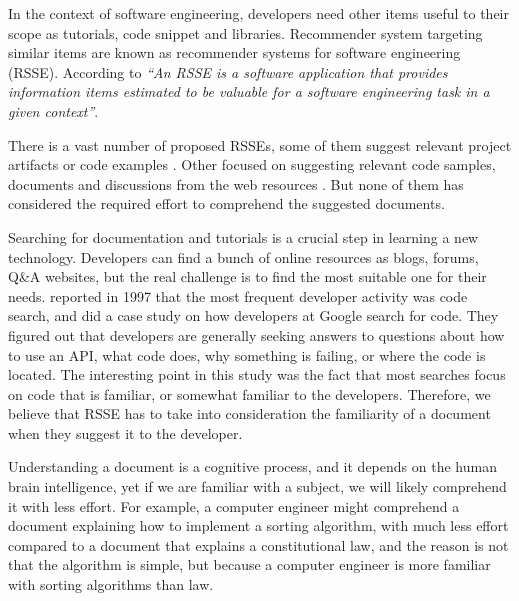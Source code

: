 \documentclass[12pt,mscthesis]{usiinfthesis}
\begin{document}
	  In the context of software engineering, developers need other items useful to their scope as tutorials, code snippet and libraries. Recommender system targeting similar items are known as recommender systems for software engineering (RSSE). According to \citet{RecommendationSystemsforSoftwareEngineering} 
	\emph{``An RSSE is a software application that provides information items estimated to be valuable for a software engineering task in a given context''}.
	

	There is a vast number of proposed RSSEs, some of them suggest relevant project artifacts or code examples \cite{Holmes:2005:USC:1062455.1062491} \cite{Cubranic:2003:HRP:776816.776866} \cite{Zimmermann:2004:MVH:998675.999460}. Other focused on suggesting relevant code samples, documents and discussions from the web resources \cite{Rahman:2015:RRS:2886444.2886471} \cite{Sawadsky:2011:FTC:1984708.1984722} \cite{Stylos:2006:MWT:1174509.1174678} \cite{10.1109/VLHCC.2012.6344497}. But none of them has considered the required effort to comprehend the suggested documents.


	Searching for documentation and tutorials is a crucial step in learning a new technology. Developers can find a bunch of online resources as blogs, forums, Q\&A websites, but the real challenge is to find the most suitable one for their needs. \citet{Singer-1997} reported in 1997 that the most frequent developer activity was code search, and \citet{Sadowski:2015} did a case study on how developers at Google search for code. They figured out that developers are generally seeking answers to questions about how to use an API, what code does, why something is failing, or where the code is located. The interesting point in this study was the fact that most searches focus on code that is familiar, or somewhat familiar to the developers.
	Therefore, we believe that RSSE has to take into consideration the familiarity of a document when they suggest it to the developer. 

	
	Understanding a document is a cognitive process, and it depends on the human brain intelligence, yet if we are familiar with a subject, we will likely comprehend it with less effort. For example, a computer engineer might comprehend a document explaining how to implement a sorting algorithm, with much less effort compared to a document that explains a constitutional law, and the reason is not that the algorithm is simple, but because a computer engineer is more familiar with sorting algorithms than law.
	
\end{document}
